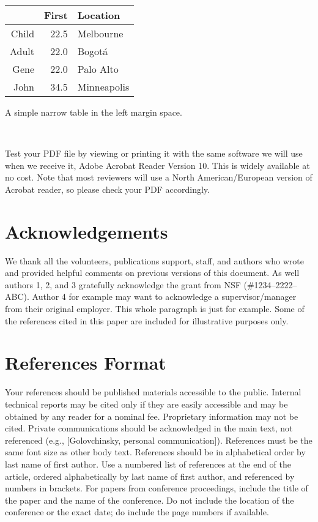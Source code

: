 \begin{margintable}[1pc]
  \begin{minipage}{\marginparwidth}
    \centering
    \begin{tabular}{r r l}
      & {\small \textbf{First}}
      & {\small \textbf{Location}} \\
      \toprule
      Child & 22.5 & Melbourne \\
      Adult & 22.0 & Bogot\'a \\
      \midrule
      Gene & 22.0 & Palo Alto \\
      John & 34.5 & Minneapolis \\
      \bottomrule
    \end{tabular}
    \caption{A simple narrow table in the left margin
      space.}~\label{tab:table2}
  \end{minipage}
\end{margintable}
Test your PDF file by viewing or printing it with the same software we
will use when we receive it, Adobe Acrobat Reader Version 10. This is
widely available at no cost. Note that most
reviewers will use a North American/European version of Acrobat
reader, so please check your PDF accordingly.

\section{Acknowledgements}
We thank all the volunteers, publications support, staff, and authors
who wrote and provided helpful comments on previous versions of this
document. As well authors 1, 2, and 3 gratefully acknowledge the grant
from NSF (\#1234--2222--ABC). Author 4 for example may want to
acknowledge a supervisor/manager from their original employer. This
whole paragraph is just for example. Some of the references cited in
this paper are included for illustrative purposes only.

\section{References Format}
Your references should be published materials accessible to the
public. Internal technical reports may be cited only if they are
easily accessible and may be obtained by any reader for a nominal
fee. Proprietary information may not be cited. Private communications
should be acknowledged in the main text, not referenced (e.g.,
[Golovchinsky, personal communication]). References must be the same
font size as other body text. References should be in alphabetical
order by last name of first author. Use a numbered list of references
at the end of the article, ordered alphabetically by last name of
first author, and referenced by numbers in brackets. For papers from
conference proceedings, include the title of the paper and the name of
the conference. Do not include the location of the conference or the
exact date; do include the page numbers if available. 

